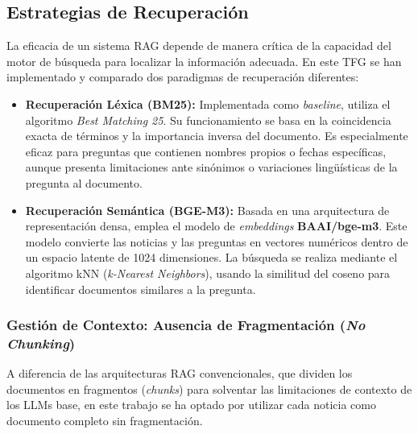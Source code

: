 \subsection{Estrategias de Recuperación}

La eficacia de un sistema RAG depende de manera crítica de la capacidad del motor de búsqueda para localizar la información adecuada. En este TFG se han implementado y comparado dos paradigmas de recuperación diferentes:

\begin{itemize}
    \item \textbf{Recuperación Léxica (BM25):} Implementada como \textit{baseline}, utiliza el algoritmo \textit{Best Matching 25}. Su funcionamiento se basa en la coincidencia exacta de términos y la importancia inversa del documento. Es especialmente eficaz para preguntas que contienen nombres propios o fechas específicas, aunque presenta limitaciones ante sinónimos o variaciones lingüísticas de la pregunta al documento.
    \item \textbf{Recuperación Semántica (BGE-M3):} Basada en una arquitectura de representación densa, emplea el modelo de \textit{embeddings} \textbf{BAAI/bge-m3}. Este modelo convierte las noticias y las preguntas en vectores numéricos dentro de un espacio latente de 1024 dimensiones. La búsqueda se realiza mediante el algoritmo kNN (\textit{k-Nearest Neighbors}), usando la similitud del coseno para identificar documentos similares a la pregunta.
\end{itemize}

\subsubsection{Gestión de Contexto: Ausencia de Fragmentación (\textit{No Chunking})}

A diferencia de las arquitecturas RAG convencionales, que dividen los documentos en fragmentos (\textit{chunks}) para solventar las limitaciones de contexto de los LLMs base, en este trabajo se ha optado por utilizar cada noticia como documento completo sin fragmentación.

